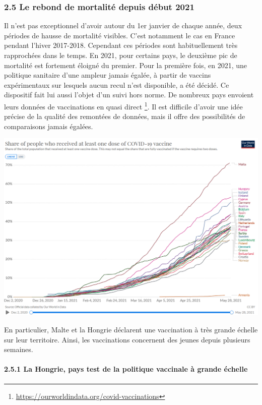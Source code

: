 \documentclass[
]{article}
\begin{document}
\hypertarget{le-rebond-de-mortalituxe9-depuis-duxe9but-2021}{%
\subsubsection{2.5 Le rebond de mortalité depuis début
2021}\label{le-rebond-de-mortalituxe9-depuis-duxe9but-2021}}

Il n'est pas exceptionnel d'avoir autour du 1er janvier de chaque année,
deux périodes de hausse de mortalité visibles. C'est notamment le cas en
France pendant l'hiver 2017-2018. Cependant ces périodes sont
habituellement très rapprochées dans le temps. En 2021, pour certains
pays, le deuxième pic de mortalité est fortement éloigné du premier.
Pour la première fois, en 2021, une politique sanitaire d'une ampleur
jamais égalée, à partir de vaccins expérimentaux sur lesquels aucun
recul n'est disponible, a été décidé. Ce dispositif fait lui aussi
l'objet d'un suivi hors norme. De nombreux pays envoient leurs données
de vaccinations en quasi direct \footnote{\url{https://ourworldindata.org/covid-vaccinations}}.
Il est difficile d'avoir une idée précise de la qualité des remontées de
données, mais il offre des possibilités de comparaisons jamais égalées.

\includegraphics[width=10.41667in,height=\textheight]{data/images/ourworldindata.png}

En particulier, Malte et la Hongrie déclarent une vaccination à très
grande échelle sur leur territoire. Ainsi, les vaccinations concernent
des jeunes depuis plusieurs semaines.

\hypertarget{la-hongrie-pays-test-de-la-politique-vaccinale-uxe0-grande-uxe9chelle}{%
\paragraph{2.5.1 La Hongrie, pays test de la politique vaccinale à
grande
échelle}\label{la-hongrie-pays-test-de-la-politique-vaccinale-uxe0-grande-uxe9chelle}}
\end{document}
